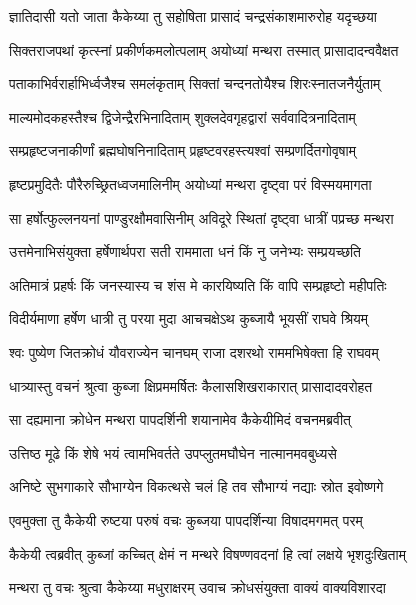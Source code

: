 
\twolineshloka
{ज्ञातिदासी यतो जाता कैकेय्या तु सहोषिता}
{प्रासादं चन्द्रसंकाशमारुरोह यदृच्छया} %

\twolineshloka
{सिक्तराजपथां कृत्स्नां प्रकीर्णकमलोत्पलाम्}
{अयोध्यां मन्थरा तस्मात् प्रासादादन्ववैक्षत} %

\twolineshloka
{पताकाभिर्वरार्हाभिर्ध्वजैश्च समलंकृताम्}
{सिक्तां चन्दनतोयैश्च शिरःस्नातजनैर्युताम्} %

\twolineshloka
{माल्यमोदकहस्तैश्च द्विजेन्द्रैरभिनादिताम्}
{शुक्लदेवगृहद्वारां सर्ववादित्रनादिताम्} %

\twolineshloka
{सम्प्रहृष्टजनाकीर्णां ब्रह्मघोषनिनादिताम्}
{प्रहृष्टवरहस्त्यश्वां सम्प्रणर्दितगोवृषाम्} %

\twolineshloka
{हृष्टप्रमुदितैः पौरैरुच्छ्रितध्वजमालिनीम्}
{अयोध्यां मन्थरा दृष्ट्वा परं विस्मयमागता} %

\twolineshloka
{सा हर्षोत्फुल्लनयनां पाण्डुरक्षौमवासिनीम्}
{अविदूरे स्थितां दृष्ट्वा धात्रीं पप्रच्छ मन्थरा} %

\twolineshloka
{उत्तमेनाभिसंयुक्ता हर्षेणार्थपरा सती}
{राममाता धनं किं नु जनेभ्यः सम्प्रयच्छति} %

\twolineshloka
{अतिमात्रं प्रहर्षः किं जनस्यास्य च शंस मे}
{कारयिष्यति किं वापि सम्प्रहृष्टो महीपतिः} %

\twolineshloka
{विदीर्यमाणा हर्षेण धात्री तु परया मुदा}
{आचचक्षेऽथ कुब्जायै भूयसीं राघवे श्रियम्} %

\twolineshloka
{श्वः पुष्येण जितक्रोधं यौवराज्येन चानघम्}
{राजा दशरथो राममभिषेक्ता हि राघवम्} %

\twolineshloka
{धात्र्यास्तु वचनं श्रुत्वा कुब्जा क्षिप्रममर्षितः}
{कैलासशिखराकारात् प्रासादादवरोहत} %

\twolineshloka
{सा दह्यमाना क्रोधेन मन्थरा पापदर्शिनी}
{शयानामेव कैकेयीमिदं वचनमब्रवीत्} %

\twolineshloka
{उत्तिष्ठ मूढे किं शेषे भयं त्वामभिवर्तते}
{उपप्लुतमघौघेन नात्मानमवबुध्यसे} %

\twolineshloka
{अनिष्टे सुभगाकारे सौभाग्येन विकत्थसे}
{चलं हि तव सौभाग्यं नद्याः स्रोत इवोष्णगे} %

\twolineshloka
{एवमुक्ता तु कैकेयी रुष्टया परुषं वचः}
{कुब्जया पापदर्शिन्या विषादमगमत् परम्} %

\twolineshloka
{कैकेयी त्वब्रवीत् कुब्जां कच्चित् क्षेमं न मन्थरे}
{विषण्णवदनां हि त्वां लक्षये भृशदुःखिताम्} %

\twolineshloka
{मन्थरा तु वचः श्रुत्वा कैकेय्या मधुराक्षरम्}
{उवाच क्रोधसंयुक्ता वाक्यं वाक्यविशारदा} %

